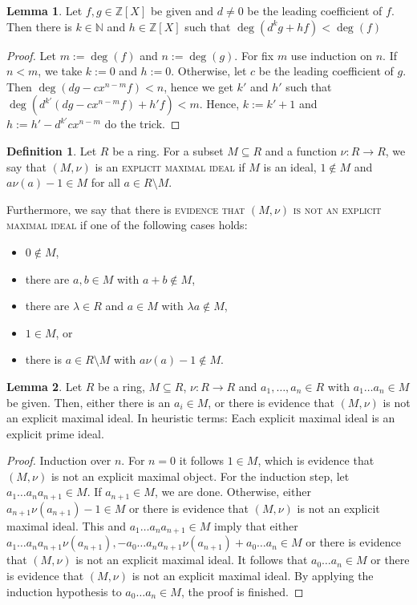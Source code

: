 \documentclass[10pt,a4paper]{article}
\theoremstyle{definition}
\newtheorem{definition}{Definition}
\newtheorem{lemma}{Lemma}
\newcommand{\NN}{\mathbb{N}}
\newcommand{\ZX}{\mathbb{Z}[X]}
\begin{document}
\begin{lemma}\label{Lem:PolyDivision}
Let $f,g\in \ZX$ be given and $d\neq 0$ be the leading coefficient of $f$. Then there is $k\in \NN$ and $h\in \ZX$ such that $\deg(d^kg+hf)<\deg(f)$
\end{lemma}
\begin{proof}
Let $m:=\deg(f)$ and $n:=\deg(g)$.
For fix $m$ use induction on $n$. If $n<m$, we take $k:=0$ and $h := 0$. Otherwise, let $c$ be the leading coefficient of $g$. Then $\deg(dg-cx^{n-m}f) < n$, hence we get $k'$ and $h'$ such that $\deg(d^{k'}(dg-cx^{n-m}f)+h'f)<m$. Hence, $k:=k'+1$ and $h:= h'-d^{k'}cx^{n-m}$ do the trick.
\end{proof}
\begin{definition}
Let $R$ be a ring. For a subset $M\subseteq R$ and a function $\nu:R\to R$, we say that $(M,\nu)$ is an \textsc{explicit maximal ideal} if $M$ is an ideal, $1\notin M$ and $a\nu(a)-1\in M$ for all $a\in R\setminus M$. 

Furthermore, we say that there is \textsc{ evidence that} $(M,\nu)$ \textsc{is not an explicit maximal ideal} if one of the following cases holds:
\begin{itemize}
\item $0\notin M$,
\item there are $a,b\in M$ with $a+b\notin M$,
\item there are $\lambda\in R$ and $a\in M$ with $\lambda a \notin M$,
\item $1\in M$, or
\item there is $a\in R\setminus M$ with $a\nu(a)-1\notin M$.
\end{itemize}
\end{definition}
\begin{lemma}\label{Lem:MaxToPrime}
Let $R$ be a ring, $M\subseteq R$, $\nu: R \to R$ and $a_1,\dots,a_n\in R$ with $a_1\dots a_n \in M$ be given. Then, either there is an $a_i\in M$, or there is evidence that $(M,\nu)$ is not an explicit maximal ideal. 
In heuristic terms: Each explicit maximal ideal is an explicit prime ideal.
\end{lemma}
\begin{proof}
Induction over $n$. For $n=0$ it follows $1\in M$, which is evidence that $(M,\nu)$ is not an explicit maximal object. For the induction step, let $a_1\dots a_n a_{n+1}\in M$. If $a_{n+1}\in M$, we are done. Otherwise, either $a_{n+1}\nu(a_{n+1})-1\in M$ or there is evidence that $(M,\nu)$ is not an explicit maximal ideal. This and $a_1\dots a_n a_{n+1}\in M$ imply that either  $a_1\dots a_n a_{n+1}\nu(a_{n+1}), -a_0\dots a_n a_{n+1}\nu(a_{n+1})+ a_0\dots a_n\in M$ or there is evidence that $(M,\nu)$ is not an explicit maximal ideal. It follows that $a_0\dots a_n\in M$ or there is evidence that $(M,\nu)$ is not an explicit maximal ideal. By applying the induction hypothesis to $a_0\dots a_n\in M$, the proof is finished. 
\end{proof}
\end{document}
